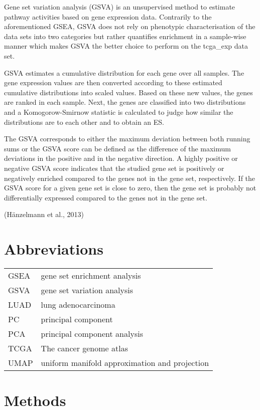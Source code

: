 \documentclass[
  parskip,
  oneside]{scrreprt}
\begin{document}
Gene set variation analysis (GSVA) is an unsupervised method to estimate
pathway activities based on gene expression data. Contrarily to the
aforementioned GSEA, GSVA does not rely on phenotypic characterisation
of the data sets into two categories but rather quantifies enrichment in
a sample-wise manner which makes GSVA the better choice to perform on
the tcga\_exp data set.

GSVA estimates a cumulative distribution for each gene over all samples.
The gene expression values are then converted according to these
estimated cumulative distributions into scaled values. Based on these
new values, the genes are ranked in each sample. Next, the genes are
classified into two distributions and a Komogorow-Smirnow statistic is
calculated to judge how similar the distributions are to each other and
to obtain an ES.

The GSVA corresponds to either the maximum deviation between both
running sums or the GSVA score can be defined as the difference of the
maximum deviations in the positive and in the negative direction. A
highly positive or negative GSVA score indicates that the studied gene
set is positively or negatively enriched compared to the genes not in
the gene set, respectively. If the GSVA score for a given gene set is
close to zero, then the gene set is probably not differentially
expressed compared to the genes not in the gene set.

(Hänzelmann et al., 2013)

\hypertarget{abbreviations}{%
\chapter{Abbreviations}\label{abbreviations}}

\begin{longtable}[]{@{}ll@{}}
\toprule
\endhead
GSEA & gene set enrichment analysis \\
GSVA & gene set variation analysis \\
LUAD & lung adenocarcinoma \\
PC & principal component \\
PCA & principal component analysis \\
TCGA & The cancer genome atlas \\
UMAP & uniform manifold approximation and projection \\
\bottomrule
\end{longtable}

\hypertarget{methods}{%
\chapter{Methods}\label{methods}}
\end{document}
